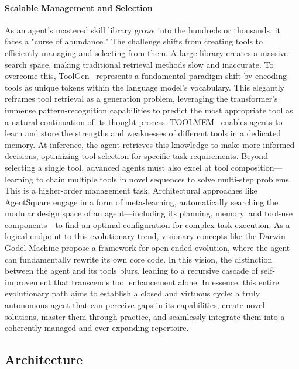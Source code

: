 \documentclass[10pt]{article} %
\begin{document}
\paragraph{Scalable Management and Selection}
As an agent's mastered skill library grows into the hundreds or thousands, it faces a "curse of abundance." The challenge shifts from creating tools to efficiently managing and selecting from them. A large library creates a massive search space, making traditional retrieval methods slow and inaccurate. To overcome this, ToolGen~\citep{wang2025toolgen} represents a fundamental paradigm shift by encoding tools as unique tokens within the language model's vocabulary. This elegantly reframes tool retrieval as a generation problem, leveraging the transformer's immense pattern-recognition capabilities to predict the most appropriate tool as a natural continuation of its thought process. TOOLMEM~\citep{xiao2025toolmem} enables agents to learn and store the strengths and weaknesses of different tools in a dedicated memory. At inference, the agent retrieves this knowledge to make more informed decisions, optimizing tool selection for specific task requirements.
Beyond selecting a single tool, advanced agents must also excel at tool composition—learning to chain multiple tools in novel sequences to solve multi-step problems. This is a higher-order management task. Architectural approaches like AgentSquare engage in a form of meta-learning, automatically searching the modular design space of an agent—including its planning, memory, and tool-use components—to find an optimal configuration for complex task execution\citep{shang2025agentsquare}. As a logical endpoint to this evolutionary trend, visionary concepts like the Darwin Godel Machine propose a framework for open-ended evolution, where the agent can fundamentally rewrite its own core code. In this vision, the distinction between the agent and its tools blurs, leading to a recursive cascade of self-improvement that transcends tool enhancement alone\citep{zhang2025darwin}. In essence, this entire evolutionary path aims to establish a closed and virtuous cycle: a truly autonomous agent that can perceive gaps in its capabilities, create novel solutions, master them through practice, and seamlessly integrate them into a coherently managed and ever-expanding repertoire.




\subsection{Architecture}
\end{document}
